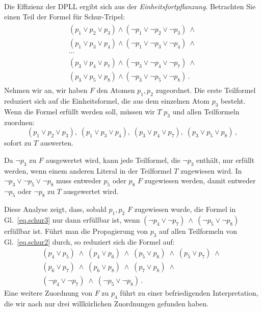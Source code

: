 Die Effizienz der DPLL ergibt sich aus der \emph{Einheitsfortpflanzung}. Betrachten Sie einen Teil der Formel für Schur-Tripel:
\begin{align}
\begin{array}{l}\label{eq.schur3}
(p_1 \vee p_2 \vee p_3) \wedge (\neg p_1 \vee \neg p_2 \vee \neg p_3) \:\wedge \\
(p_1 \vee p_3 \vee p_4) \wedge (\neg p_1 \vee \neg p_3 \vee \neg p_4) \:\wedge \\
\cdots\\
(p_3 \vee p_4 \vee p_7) \wedge (\neg p_3 \vee \neg p_4 \vee \neg p_7) \:\wedge \\
(p_3 \vee p_5 \vee p_8) \wedge (\neg p_3 \vee \neg p_5 \vee \neg p_8)\,.
\end{array}
\end{align}
Nehmen wir an, wir haben $F$ den Atomen $p_1,p_2$ zugeordnet. Die erste Teilformel reduziert sich auf die Einheitsformel, die aus dem einzelnen Atom $p_3$ besteht. Wenn die Formel erfüllt werden soll, müssen wir $T$ $p_3$ und allen Teilformeln zuordnen:
\[
(p_1 \vee p_2 \vee p_3),\;(p_1 \vee p_3 \vee p_4),\;
(p_3 \vee p_4 \vee p_7),\;(p_3 \vee p_5 \vee p_8)\,,
\]
sofort zu $T$ auswerten.

Da $\neg p_3$ zu $F$ ausgewertet wird, kann jede Teilformel, die $\neg p_3$ enthält, nur erfüllt werden, wenn einem anderen Literal in der Teilformel $T$ zugewiesen wird. In $\neg p_3 \vee \neg p_5 \vee \neg p_8$ muss entweder $p_5$ oder $p_8$ $F$ zugewiesen werden, damit entweder $\neg p_5$ oder $\neg p_8$ zu $T$ ausgewertet wird.

Diese Analyse zeigt, dass, sobald $p_1,p_2$ $F$ zugewiesen wurde, die Formel in Gl.~\ref{eq.schur3} nur dann erfüllbar ist, wenn $(\neg p_4 \vee \neg p_7) \:\wedge\: (\neg p_5 \vee \neg p_8)$ erfüllbar ist. Führt man die Propagierung von $p_3$ auf allen Teilformeln von Gl.~\ref{eq.schur2} durch, so reduziert sich die Formel auf:
\[
\begin{array}{l}
(p_4\vee p_5)\;\wedge\;(p_4\vee p_6)\;\wedge\;(p_5\vee p_6)\;\wedge\;(p_5\vee p_7)\;\wedge\;\\
(p_6\vee p_7)\;\wedge\;(p_6\vee p_8)\;\wedge\;(p_7\vee p_8)\;\wedge\\
(\neg p_4\vee \neg p_7)\;\wedge\;
(\neg p_5\vee \neg p_8)\,.
\end{array}
\]
Eine weitere Zuordnung von $F$ zu $p_4$ führt zu einer befriedigenden Interpretation, die wir nach nur drei willkürlichen Zuordnungen gefunden haben.


